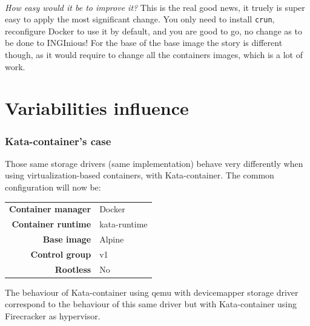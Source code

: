 \paragraph{}\textit{How easy would it be to improve it?}  This is the real good news, it truely is super easy to apply the most significant change.  You only need to install \texttt{crun}, reconfigure Docker to use it by default, and you are good to go, no change as to be done to INGInious!  For the base of the base image the story is different though, as it would require to change all the containers images, which is a lot of work.

\section{Variabilities influence}

\clearpage
\subsubsection{Kata-container's case}
Those same storage drivers (same implementation) behave very differently when using virtualization-based containers, with Kata-container.  The common configuration will now be:

\begin{tabular}{rl}
   \textbf{Container manager} & Docker \\
   \textbf{Container runtime} & kata-runtime \\
   \textbf{Base image} & Alpine \\
   \textbf{Control group} & v1 \\
   \textbf{Rootless} & No 
\end{tabular}

The behaviour of Kata-container using qemu with devicemapper storage driver correspond to the behaviour of this same driver but with Kata-container using Firecracker as hypervisor.

